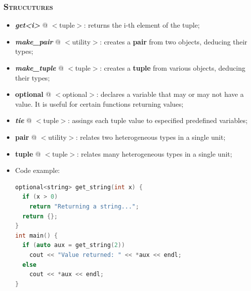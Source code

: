 \documentclass[10pt]{article}
\begin{document}
\begin{multicols*}{4}
{{\subsubsection*{\textsc{Strucutures}} 
\begin{itemize}[leftmargin=*,topsep=0.25pt]
  \setlength\itemsep{-1.8pt}
\item  \emph{{\textbf{get<i>}}} @ $<$tuple$>$: returns the i-th element of the tuple;  
\item  \emph{\textbf{make\_pair}} @ $<$utility$>$: creates a \textbf{pair} from two objects, deducing their types; 
\item  \emph{\textbf{make\_tuple}} @ $<$tuple$>$: creates a \textbf{tuple} from various objects, deducing their types; 
\item  {\textbf{optional}} @ $<$optional$>$: declares a variable that may or may not have a value. It is useful for certain functions returning values;
\item  \emph{\textbf{tie}} @ $<$tuple$>$: assings each tuple value to especified predefined variables; 
\item  {\textbf{pair}} @ $<$utility$>$: relates two heterogeneous types in a single unit; 
\item  {\textbf{tuple}} @ $<$tuple$>$: relates many heterogeneous types in a single unit;
\item Code example:
{\selectfont \lstset{style=mystyle}
 \begin{lstlisting}[language=C++]
optional<string> get_string(int x) {
  if (x > 0)
    return "Returning a string...";
  return {};
}
int main() {
  if (auto aux = get_string(2))
    cout << "Value returned: " << *aux << endl;
  else
    cout << *aux << endl;
}
\end{lstlisting}
 }
\end{itemize}



}}
\end{multicols*}
\end{document}
